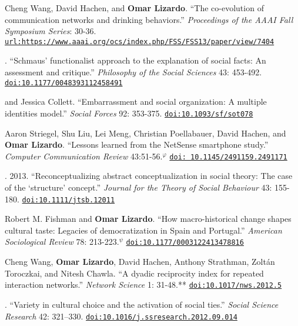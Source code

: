 
\ind Cheng Wang, David Hachen, and {\bf Omar Lizardo}. ``The co-evolution of communication networks and drinking behaviors.''  {\em Proceedings of the AAAI Fall Symposium Series}: 30-36. \href{https://www.aaai.org/ocs/index.php/FSS/FSS13/paper/view/7404}{\nolinkurl{url:https://www.aaai.org/ocs/index.php/FSS/FSS13/paper/view/7404}}

.  ``Schmaus' functionalist approach to the explanation of social facts: An assessment and critique.''  {\em Philosophy of the Social Sciences} 43: 453-492. \href{https://doi.org/10.1177/0048393112458491}{\nolinkurl{doi:10.1177/0048393112458491}} 

 and Jessica Collett. ``Embarrassment and social organization: A multiple identities model.'' {\em Social Forces} 92: 353-375.  \href{https://doi.org/10.1093/sf/sot078}{\nolinkurl{doi:10.1093/sf/sot078}}

\ind Aaron Striegel, Shu Liu, Lei Meng, Christian Poellabauer, David Hachen, and {\bf Omar Lizardo}. ``Lessons learned from the NetSense smartphone study.'' {\em Computer Communication Review} 43:51-56.\textcolor{black}{$^{\varphi}$}  \href{https://doi.org/ 10.1145/2491159.2491171}{\nolinkurl{doi: 10.1145/2491159.2491171}}

. 2013. ``Reconceptualizing abstract conceptualization in social theory: The case of the ‘structure’ concept.'' {\em Journal for the Theory of Social Behaviour} 43: 155-180. \href{https://doi.org/10.1111/jtsb.12011}{\nolinkurl{doi:10.1111/jtsb.12011}} 

\ind Robert M. Fishman and {\bf Omar Lizardo}. ``How macro-historical change shapes cultural taste: Legacies of democratization in Spain and Portugal.'' {\em American Sociological Review} 78: 213-223.\textcolor{black}{$^{\psi}$} \href{https://doi.org/10.1177/0003122413478816}{\nolinkurl{doi:10.1177/0003122413478816}}

\ind Cheng Wang, {\bf Omar Lizardo}, David Hachen, Anthony Strathman, Zolt\'{a}n Toroczkai, and Nitesh Chawla. ``A dyadic reciprocity index for repeated interaction networks.'' {\em Network Science} 1: 31-48.\textcolor{uclablue}{**} \href{https://doi.org/10.1017/nws.2012.5}{\nolinkurl{doi:10.1017/nws.2012.5}}

. ``Variety in cultural choice and the activation of social ties.'' {\em Social Science Research} 42: 321–330. \href{https://doi.org/10.1016/j.ssresearch.2012.09.014}{\nolinkurl{doi:10.1016/j.ssresearch.2012.09.014}}